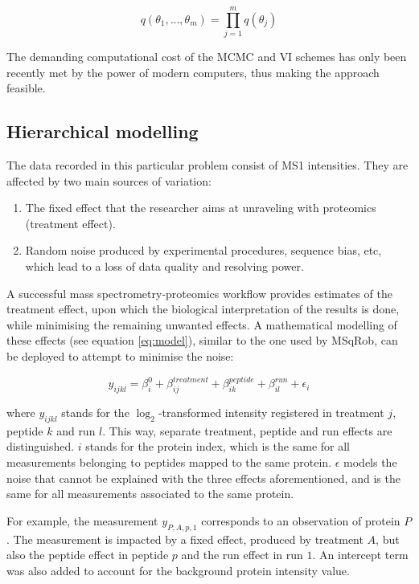 \begin{equation}\label{eq:mean_field}
q(\theta_1, ..., \theta_m) = \prod_{j=1}^{m}{q(\theta_j)}
\end{equation} 

The demanding computational cost of the \ac{MCMC} and \ac{VI} schemes has only been recently met by the power of modern computers, thus making the approach feasible.


\subsection{Hierarchical modelling}
\label{subsec:hierarchy}


The data recorded in this particular problem consist of \ac{MS1} intensities. They are affected by two main sources of variation:

\begin{enumerate}
\item The fixed effect that the researcher aims at unraveling with proteomics (treatment effect).
\item Random noise produced by experimental procedures, sequence bias, etc, which lead to a loss of data quality and resolving power.
\end{enumerate}


A successful mass spectrometry-proteomics workflow  provides estimates of the treatment effect, upon which the biological interpretation of the results is done, while minimising the remaining unwanted effects. A mathematical modelling of these effects (see equation \ref{eq:model}), similar to the one used by MSqRob, can be deployed to attempt to minimise the noise:

\begin{equation}\label{eq:model}
y_{ijkl} = \beta_{i}^{0} + \beta_{ij}^{treatment} + \beta_{ik}^{peptide} + \beta_{il}^{run} + \epsilon_{i}
\end{equation}

where $y_{ijkl}$ stands for the $\log_2$-transformed intensity registered in treatment $j$, peptide $k$ and run $l$. This way, separate treatment, peptide and run effects are distinguished. $i$ stands for the protein index, which is the same for all measurements belonging to peptides mapped to the same protein. $\epsilon$ models the noise that cannot be explained with the three effects aforementioned, and is the same for all measurements associated to the same protein.

For example, the measurement $y_{P,A,p,1}$ corresponds to an observation of protein $P$. The measurement is impacted by a fixed effect, produced by treatment $A$, but also the peptide effect in peptide $p$ and the run effect in run $1$. An intercept term was also added to account for the background protein intensity value.

